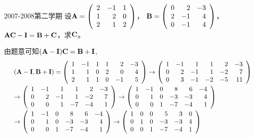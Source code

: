\begin{frame}
\begin{scriptsize}
\begin{exampleblock}{2007-2008第二学期}
设$\mathbf{A}=\left(
\begin{array}{rrr}
2&-1&1\\
1&2&0\\
2&1&2
\end{array}
\right)$， $\mathbf{B}=\left(
\begin{array}{rrr}
0&2&-3\\
2&-1&4\\
0&-1&4
\end{array}
\right)$，$\mathbf{A}\mathbf{C}-\mathbf{I}=\mathbf{B}+\mathbf{C}$，求$\mathbf{C}$。
\end{exampleblock}
\pause\jiename
由题意可知$(\mathbf{A}-\mathbf{I})\mathbf{C}=\mathbf{B}+\mathbf{I}$,
$$
\begin{array}{rl}
&(\mathbf{A}-\mathbf{I},\mathbf{B}+\mathbf{I})=\left(
\begin{array}{rrrrrr}
1&-1&1 &1&2&-3\\
1&1&0 &2&0&4\\
2&1&1&0&-1&5
\end{array}
\right)\rightarrow\left(
\begin{array}{rrrrrr}
1&-1&1 &1&2&-3\\
0&2&-1 &1&-2&7\\
0&3&-1&-2&-5&11
\end{array}
\right)\\[0.2in]
&\rightarrow\left(
\begin{array}{rrrrrr}
1&-1&1 &1&2&-3\\
0&2&-1 &1&-2&7\\
0&0&1&-7&-4&1
\end{array}
\right) \rightarrow\left(
\begin{array}{rrrrrr}
1&-1&0 &8&6&-4\\
0&1&0 &-3&-3&4\\
0&0&1&-7&-4&1
\end{array}
\right)\\[0.2in]
& \rightarrow\left(
\begin{array}{rrrrrr}
1&-1&0 &8&6&-4\\
0&1&0 &-3&-3&4\\
0&0&1&-7&-4&1
\end{array}
\right) \rightarrow\left(
\begin{array}{rrrrrr}
1&0&0 &5&3&0\\
0&1&0 &-3&-3&4\\
0&0&1&-7&-4&1
\end{array}
\right)
\end{array}
$$
\end{scriptsize}
\end{frame}


